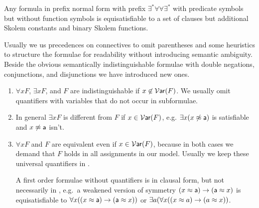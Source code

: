 \begin{lemma}
	Any formula in prefix normal form with prefix $\exists^* \forall\forall \exists^*$ 
	with predicate symbols but without function symbols 
	is equisatisfiable to a set of clauses 
	but additional Skolem constants and binary Skolem functions.
\end{lemma}


\begin{remark}Usually we us precedences on connectives to omit parentheses 
	and some heuristics to structure the formulae for readability 
	without introducing semantic ambiguity.
%
	Beside the obvious semantically indistinguishable formulae with double negations, conjunctions, and disjunctions 
	we have introduced new ones.
	\begin{enumerate}
		\item $\forall x F$, $\exists x F$, and $F$ are indistinguishable if $x\not\in\operatorname{\mathcal{V}\mathsf{ar}}(F)$. 
		We usually omit quantifiers with variables that do not occur in subformulae.
		\item In general $\exists x F$ is different from $F$ if $x\in\operatorname{\mathcal{V}\mathsf{ar}}(F)$, e.g. $\exists x(x\not\approx{\mathsf a})$ is satisfiable and $x\not\approx{\mathsf a}$ isn't.
		\item $\forall x F$ and $F$ are equivalent even if $x\in\operatorname{\mathcal{V}\mathsf{ar}}(F)$, 
		because in both cases we demand that $F$ holds in all assignments in our model.
		Usually we keep these universal quantifiers in \FOF.
		
		A first order formulae without quantifiers is in {\myem clausal form}, 
		but not necessarily in \CNF, e.g.~a weakened version of symmetry $(x\approx {\mathsf a})\rightarrow ({\mathsf a}\approx x)$ 
		is equisatisfiable to $\forall x ((x\approx {\mathsf a})\rightarrow ({\mathsf a}\approx x))$ 
		or $\exists a (\forall x ((x\approx a)\rightarrow (a\approx x))$. 
	\end{enumerate}

\end{remark}